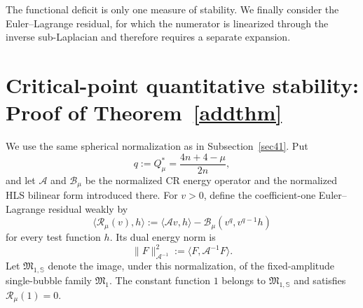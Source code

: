 \documentclass[11pt]{article}
\begin{document}
The functional deficit is only one measure of stability. We finally consider the Euler--Lagrange residual, for which the numerator is linearized through the inverse sub-Laplacian and therefore requires a separate expansion.

\section{\texorpdfstring{{Critical-point quantitative stability: Proof of Theorem~\ref{addthm}}}{Critical-point quantitative stability: Proof of Theorem 3.4}}\label{sec7}

\begingroup
We use the same spherical normalization as in Subsection~\ref{sec41}. Put
\[
 q:=Q^{\ast}_{\mu}=\frac{4n+4-\mu}{2n},
\]
and let $\mathscr A$ and $\mathcal B_\mu$ be the normalized CR energy operator and the normalized HLS bilinear form introduced there. For $v>0$, define the coefficient-one Euler--Lagrange residual weakly by
\begin{equation}\label{sphere-residual}
 \big\langle\mathscr R_\mu(v),h\big\rangle
 :=\langle\mathscr Av,h\rangle-\mathcal B_\mu(v^q,v^{q-1}h)
\end{equation}
for every test function $h$. Its dual energy norm is
\[
 \|F\|_{\mathscr A^{-1}}^2:=\langle F,\mathscr A^{-1}F\rangle.
\]
Let $\mathfrak M_{1,\mathbb S}$ denote the image, under this normalization, of the fixed-amplitude single-bubble family $\mathfrak M_1$. The constant function $1$ belongs to $\mathfrak M_{1,\mathbb S}$ and satisfies $\mathscr R_\mu(1)=0$.
\end{document}
